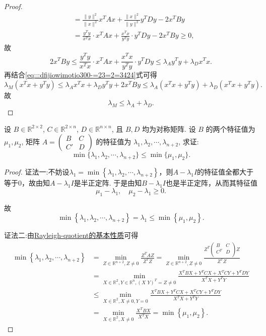 \documentclass[../../main.tex]{subfiles}
\begin{document}
\begin{proof}
\begin{align*}
&= \frac{\| y \|^2}{\| x \|^2}x^T A x + \frac{\| x \|^2}{\| y \|^2}y^T D y - 2x^T B y \\
&= \frac{y^T y}{x^T x} \cdot x^T A x + \frac{x^T x}{y^T y} \cdot y^T D y - 2x^T B y \geqslant 0,
\end{align*}
故
$$2x^T B y \leqslant \frac{y^T y}{x^T x} \cdot x^T A x + \frac{x^T x}{y^T y} \cdot y^T D y \leqslant \lambda_A y^T y + \lambda_D x^T x.$$
再结合\eqref{eq:::dfijiowimotio300-=23=2=3424}式可得
$$\lambda_M (x^T x + y^T y) \leqslant \lambda_A x^T x + \lambda_D y^T y + 2x^T B y \leqslant \lambda_A (x^T x + y^T y) + \lambda_D (x^T x + y^T y).$$
故
$$\lambda_M \leqslant \lambda_A + \lambda_D.$$

\end{proof}

\begin{example}
设 $B \in \mathbb{R}^{2 \times 2}$, $C \in \mathbb{R}^{2 \times n}$, $D \in \mathbb{R}^{n \times n}$, 且 $B,D$ 均为对称矩阵. 设 $B$ 的两个特征值为 $\mu_1,\mu_2$, 矩阵 $A = \begin{pmatrix} B & C \\ C' & D \end{pmatrix}$ 的特征值为 $\lambda_1,\lambda_2,\cdots,\lambda_{n+2}$, 求证:
$$\min\{\lambda_1,\lambda_2,\cdots,\lambda_{n+2}\} \leqslant \min\{\mu_1,\mu_2\}.$$
\end{example}
\begin{proof}
{\color{blue}证法一:}不妨设$\lambda_1=\min\left\{ \lambda_1,\lambda_2,\cdots,\lambda_{n+2} \right\}$，则$A-\lambda_1 I$的特征值全都大于等于$0$，故由知$A-\lambda_1 I$是半正定阵.
于是由知$B-\lambda_1 I$也是半正定阵，从而其特征值
$$\mu_1-\lambda_1, \quad \mu_2-\lambda_1 \geqslant 0.$$

故
$$\min\left\{ \lambda_1,\lambda_2,\cdots,\lambda_{n+2} \right\}=\lambda_1 \leqslant \min\left\{ \mu_1,\mu_2 \right\}.$$

{\color{blue}证法二:}由\hyperref[proposition:Rayleigh-quotient瑞丽商的基本性质]{Rayleigh-quotient的基本性质}可得
\begin{align*}
\min \left\{ \lambda _1,\lambda _2,\cdots ,\lambda _{n+2} \right\} &=\underset{Z\in \mathbb{R} ^{n+2},Z\ne 0}{\min}\frac{Z^TAZ}{Z^TZ}=\underset{Z\in \mathbb{R} ^{n+2},Z\ne 0}{\min}\frac{Z^T\left( \begin{matrix}
B&		C\\
C^T&		D\\
\end{matrix} \right) Z}{Z^TZ}
\\
&=\underset{X\in \mathbb{R} ^2,Y\in \mathbb{R} ^n,\left( X\,\,Y \right) ^T=Z\ne 0}{\min}\frac{X^TBX+Y^TCX+X^TCY+Y^TDY}{X^TX+Y^TY}
\\
&\leqslant \underset{X\in \mathbb{R} ^2,X\ne 0,Y=0}{\min}\frac{X^TBX+Y^TCX+X^TCY+Y^TDY}{X^TX+Y^TY}
\\
&=\underset{X\in \mathbb{R} ^2,X\ne 0}{\min}\frac{X^TBX}{X^TX}=\min \left\{ \mu _1,\mu _2 \right\} .
\end{align*}

\end{proof}
\end{document}
